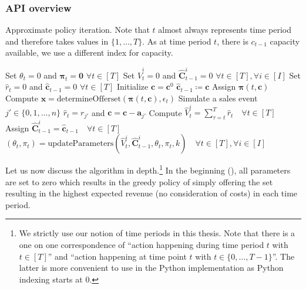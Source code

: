 \subsubsection{API overview}

\begin{algorithm}
	\caption{Approximate policy iteration. Note that $t$ almost always represents time period and therefore takes values in $\{1, \dots, T\}$. As at time period $t$, there is $c_{t-1}$ capacity available, we use a different index for capacity.}\label{alg-API}
	\begin{algorithmic}[1]
		\State Set $\theta_t = 0$ and $\boldsymbol{\pi}_t = \boldsymbol{0}$ $\forall t \in [T]$ \label{alg-API1}
		 \label{alg-API-Piter1}
		\State Set $\hat{V}_t^i = 0$ and $\boldsymbol{\hat{C}}_{t-1}^i = 0$ $\forall t \in [T], \forall i \in [I] $ \label{alg-API-Piter2}\label{alg-API3}
		\label{alg-API-Peval1}
		\State Set $\hat{r}_t = 0$ and $\boldsymbol{\hat{c}}_{t-1} = 0$ $\forall t \in [T]$ \label{alg-API5}
		\State Initialize $\boldsymbol{c} = \boldsymbol{c}^0$\label{alg-API6}
		\State $\boldsymbol{\hat{c}}_{t-1} \coloneqq \boldsymbol{c}$\label{alg-API8}
		\State Assign $\boldsymbol{\pi}(t, \boldsymbol{c})$ \label{alg-API-calcPi}\label{alg-API9}
		\State Compute $\boldsymbol{x} = \text{determineOfferset}(\boldsymbol{\pi}(t, \boldsymbol{c}), \epsilon_t)$ \label{alg-API10}
		\State Simulate a sales event $j' \in \{0, 1, \dots, n\}$\label{alg-API11}
		\State $\hat{r}_t = r_{j'}$ and $\boldsymbol{c} = \boldsymbol{c} - \boldsymbol{a}_{j'}$\label{alg-API13}
		\EndIf
		\EndFor
		\State Compute $\hat{V}_t^i = \sum_{\tau = t}^{T}\hat{r}_t \quad \forall t \in [T]$\label{alg-API14}
		\State Assign $\boldsymbol{\hat{C}}_{t-1}^i = \boldsymbol{\hat{c}}_{t-1} \quad \forall t \in [T]$ \label{alg-API15} \label{alg-API-Peval2}
		\EndFor
		\State $\left(\theta_t, \pi_t \right) = \text{updateParameters}\left(\hat{V}_t^i, \boldsymbol{\hat{C}}_{t-1}^i, \theta_t, \pi_t, k\right) \quad \forall t \in [T], \forall i \in [I]$ \label{alg-API-updateParam}\label{alg-API-Piter3}
		\EndFor
	\end{algorithmic}
\end{algorithm}

Let us now discuss the algorithm in depth.\footnote{We strictly use our notion of time periods in this thesis. Note that there is a one on one correspondence of \enquote{action happening during time period $t$ with $t\in[T]$} and \enquote{action happening at time point $t$ with $t\in \{0, \dots, T-1\}$}. The latter is more convenient to use in the Python implementation as Python indexing starts at $0$.} In the beginning (), all parameters are set to zero which results in the greedy policy of simply offering the set resulting in the highest expected revenue (no consideration of costs) in each time period.

